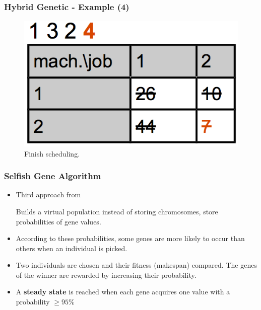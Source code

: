 \begin{frame}
  \frametitle{Hybrid Genetic - Example (4)}

\begin{figure}[htbp]
	\centering
		\includegraphics[scale=1]{images/hyb4.png}
	\caption{Finish scheduling.}
	\label{fig:label}
\end{figure}
	
 
\end{frame}


\begin{frame}
  \frametitle{Selfish Gene Algorithm}

\begin{itemize}

	\item Third approach from \cite{Khuri}%

	\item [ Builds a virtual population ] instead of storing chromosomes, store probabilities of gene values.

	\item According to these probabilities, some genes are more likely to occur than others when an individual is picked.

	\item Two individuals are chosen and their fitness (makespan) compared. The genes of the winner are rewarded by increasing their probability.
	
	\item A \textbf{steady state} is reached when each gene acquires one value with a probability $\geq 95\%$
\end{itemize}

\end{frame}

